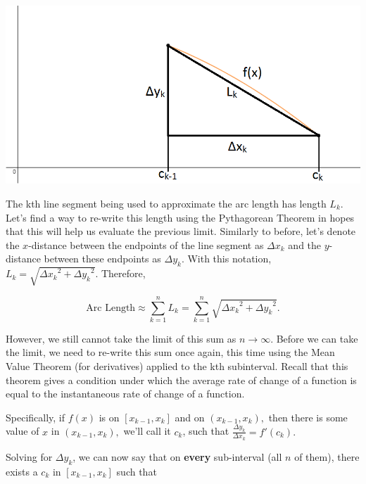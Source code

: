 \documentclass[handout,nooutcomes]{ximera}
\begin{document}
\begin{center} \includegraphics{generalpythagorean.png} \end{center}

The kth line segment being used to approximate the arc length has length $L_k$.  Let's find a way to re-write this length using the Pythagorean Theorem in hopes that this will help us evaluate the previous limit.  Similarly to before, let's denote the $x$-distance between the endpoints of the line segment as ${\Delta x}_k$ and the $y$-distance between these endpoints as ${\Delta y}_k$.  With this notation, $L_k = \sqrt{{{\Delta x}_k}^2+{{\Delta y}_k}^2}$.  Therefore,

$$\text{Arc Length} \approx \displaystyle\sum_{k=1}^n L_k = \displaystyle\sum_{k=1}^n \sqrt{{{\Delta x}_k}^2+{{\Delta y}_k}^2}.$$

However, we still cannot take the limit of this sum as $n \to \infty$.  Before we can take the limit, we need to re-write this sum once again, this time using the Mean Value Theorem (for derivatives) applied to the kth subinterval.  Recall that this theorem gives a condition under which the average rate of change of a function is equal to the instantaneous rate of change of a function.

\begin{problem}
Specifically, if $f(x)$ is  on $[x_{k-1},x_k]$ and  on $(x_{k-1},x_k),$ then there is some value of $x$ in $(x_{k-1},x_k),$ we'll call it $c_k$, such that $\frac{\Delta y_k}{\Delta x_k} = f'(c_k).$
\end{problem}

Solving for $\Delta y_k$, we can now say that on \textbf{every} sub-interval (all $n$ of them), there exists a $c_k$ in $[x_{k-1}, x_k]$ such that
\end{document}
